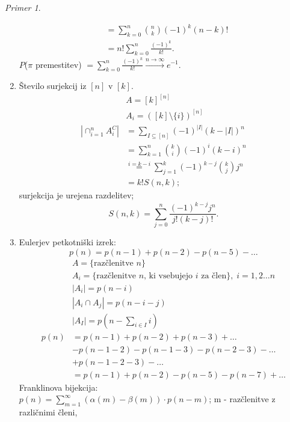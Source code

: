 \documentclass[a4paper, 12pt]{book}
\theoremstyle{definition}
\theoremstyle{remark}
\newtheorem*{ex}{Primer}
\begin{document}
\begin{ex}
\begin{enumerate}[label=(\arabic{*})]
\begin{align*}
        &= \sum_{k=0}^{n} \binom{n}{k} (-1)^k (n-k)! \\
        &= n! \sum_{k=0}^{n} \frac{(-1)^k}{k!}.
      \end{align*}
      $P$($\pi$ premestitev) $= \sum_{k=0}^{n} \frac{(-1)^k}{k!} \stackrel{n \to \infty}{\longrightarrow} e^{-1}$.
    \item Število surjekcij iz $[n]$ v $[k]$.
      \begin{align*}
        &A = [k]^{[n]} \\
        &A_i = ([k] \setminus \{i\})^{[n]} \\
        \left|\cap_{i=1}^n A_i^C\right| &= \sum_{I \subseteq [n]} (-1)^{|I|} (k - |I|)^n \\
        &= \sum_{k=1}^{n} \binom{k}{i} (-1)^i (k-i)^n \\
        &\stackrel{i=k-i}{=} \sum_{j=1}^{k} (-1)^{k-j} \binom{k}{j} j^n \\
        &= k! S(n,k);
      \end{align*}
      surjekcija je urejena razdelitev;
      \begin{equation*}
        S(n,k) = \sum_{j=0}^{n} \frac{(-1)^{k-j} j^n}{j! (k-j)!}.
      \end{equation*}
    \item Eulerjev petkotniški izrek:
      \begin{equation*}
        p(n) = p(n-1) + p(n-2) - p(n-5) - \dots
      \end{equation*}
      \begin{align*}
        &A = \{\text{razčlenitve }n\} \\
        &A_i = \{\text{razčlenitve }n \text{, ki vsebujejo }i \text{ za člen}\}, \; i = 1,2 \dots n \\
        &|A_i| = p(n-i) \\
        &|A_i \cap A_j| = p(n-i-j) \\
        &|A_I| = p(n - \sum_{i \in I} i) \\
        p(n) &= p(n-1) + p(n-2) + p(n-3) + \dots \\
        &- p(n-1-2) - p(n-1-3) - p(n-2-3) - \dots \\
        &+ p(n-1-2-3) - \dots \\
        &= p(n-1) + p(n-2) - p(n-5) - p(n-7) + \dots
      \end{align*}
      Franklinova bijekcija: \\
      $p(n) = \sum_{m=1}^{\infty} (\alpha(m) - \beta(m)) \cdot p(n-m)$; m - razčlenitve z različnimi členi, \\

\end{enumerate}
\end{ex}
\end{document}
